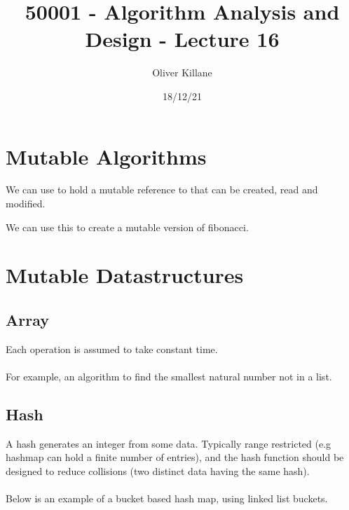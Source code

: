 \documentclass{report}
\title{50001 - Algorithm Analysis and Design - Lecture 16}
\author{Oliver Killane}
\date{18/12/21}
\begin{document}
\maketitle
{}

\section*{Mutable Algorithms}
We can use    to hold a mutable reference to
 that can be created, read and modified.

We can use this to create a mutable version of fibonacci.

\section*{Mutable Datastructures}
\subsection*{Array}
Each operation is assumed to take constant time.
\\
\\ For example, an algorithm to find the smallest natural number not in a list.

\subsection*{Hash}
A hash generates an integer from some data. Typically range restricted
(e.g hashmap can hold a finite number of entries), and the hash function
should be designed to reduce collisions (two distinct data having the same hash).
\\
\\ Below is an example of a bucket based hash map, using linked list buckets.
\end{document}
